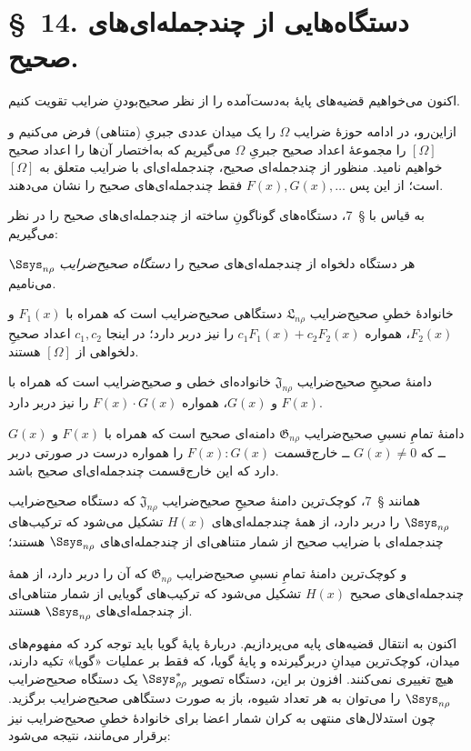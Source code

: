\documentclass[11pt]{article}
\providecommand{\Lsys}{\mathfrak{L}}
\providecommand{\Jdom}{\mathfrak{J}}
\providecommand{\Gdom}{\mathfrak{G}}
\begin{document}
\section*{\S\ 14. دستگاه‌هایی از چندجمله‌ای‌های صحیح.}

اکنون می‌خواهیم قضیه‌های پایهٔ به‌دست‌آمده را از نظر صحیح‌بودنِ ضرایب تقویت کنیم.

ازاین‌رو، در ادامه حوزهٔ ضرایب $\Omega$ را یک میدان عددی جبریِ (متناهی) فرض می‌کنیم و $[\Omega]$ را مجموعهٔ اعداد صحیح جبریِ $\Omega$ می‌گیریم که به‌اختصار آن‌ها را اعداد صحیح خواهیم نامید. منظور از چندجمله‌ای صحیح، چندجمله‌ای‌ای با ضرایب متعلق به $[\Omega]$ است؛ از این پس $F(x),G(x),\ldots$ فقط چندجمله‌ای‌های صحیح را نشان می‌دهند.

به قیاس با \S\ 7، دستگاه‌های گوناگونِ ساخته از چندجمله‌ای‌های صحیح را در نظر می‌گیریم:

هر دستگاه دلخواه از چندجمله‌ای‌های صحیح را \emph{دستگاه صحیح‌ضرایب} $\Ssys_{n\rho}$ می‌نامیم.

خانوادهٔ خطیِ صحیح‌ضرایب $\Lsys_{n\rho}$ دستگاهی صحیح‌ضرایب است که همراه با $F_1(x)$ و $F_2(x)$، همواره $c_1F_1(x)+c_2F_2(x)$ را نیز دربر دارد؛ در اینجا $c_1,c_2$ اعداد صحیحِ دلخواهی از $[\Omega]$ هستند.

دامنهٔ صحیحِ صحیح‌ضرایب $\Jdom_{n\rho}$ خانواده‌ای خطی و صحیح‌ضرایب است که همراه با $F(x)$ و $G(x)$، همواره $F(x)\cdot G(x)$ را نیز دربر دارد.

دامنهٔ تمامِ نسبیِ صحیح‌ضرایب $\Gdom_{n\rho}$ دامنه‌ای صحیح است که همراه با $F(x)$ و $G(x)$ ــ که $G(x)\ne0$ ــ خارج‌قسمت $F(x):G(x)$ را همواره درست در صورتی دربر دارد که این خارج‌قسمت چندجمله‌ای‌ای صحیح باشد.

همانند \S\ 7، کوچک‌ترین دامنهٔ صحیحِ صحیح‌ضرایب $\Jdom_{n\rho}$ که دستگاه صحیح‌ضرایب $\Ssys_{n\rho}$ را دربر دارد، از همهٔ چندجمله‌ای‌های $H(x)$ تشکیل می‌شود که ترکیب‌های چندجمله‌ای با ضرایب صحیح از شمار متناهی‌ای از چندجمله‌ای‌های $\Ssys_{n\rho}$ هستند؛

و کوچک‌ترین دامنهٔ تمامِ نسبیِ صحیح‌ضرایب $\Gdom_{n\rho}$ که آن را دربر دارد، از همهٔ چندجمله‌ای‌های صحیح $H(x)$ تشکیل می‌شود که ترکیب‌های گویایی از شمار متناهی‌ای از چندجمله‌ای‌های $\Ssys_{n\rho}$ هستند.

اکنون به انتقال قضیه‌های پایه می‌پردازیم. دربارهٔ پایهٔ گویا باید توجه کرد که مفهوم‌های میدان، کوچک‌ترین میدانِ دربرگیرنده و پایهٔ گویا، که فقط بر عملیات «گویا» تکیه دارند، هیچ تغییری نمی‌کنند. افزون بر این، دستگاه تصویر $\Ssys^*_{\rho\rho}$ یک دستگاه صحیح‌ضرایب $\Ssys_{n\rho}$ را می‌توان به هر تعداد شیوه، باز به صورت دستگاهی صحیح‌ضرایب برگزید. چون استدلال‌های منتهی به کران شمار اعضا برای خانوادهٔ خطیِ صحیح‌ضرایب نیز برقرار می‌مانند، نتیجه می‌شود:
\end{document}
